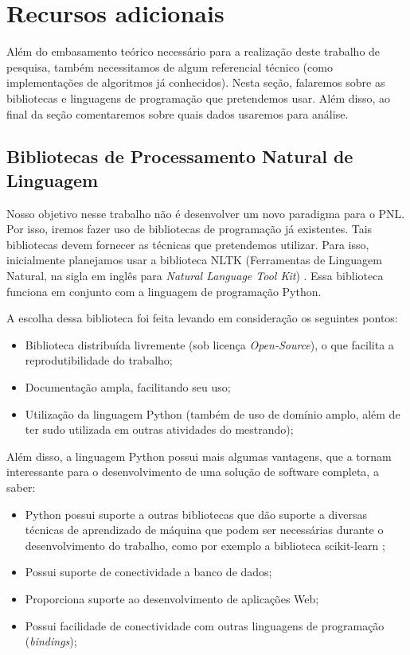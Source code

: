 \documentclass[
	12pt,				%
	openright,			%
	twoside,			%
	a4paper,			%
	english,			%
	spanish,			%
	brazil,				%
	]{abntex2}
\begin{document}
\section{Recursos adicionais}
Além do embasamento teórico necessário para a realização deste trabalho de pesquisa, também necessitamos de algum referencial técnico (como implementações de algoritmos já conhecidos). Nesta seção, falaremos sobre as bibliotecas e linguagens de programação que pretendemos usar. Além disso, ao final da seção comentaremos sobre quais dados usaremos para análise.

\subsection{Bibliotecas de Processamento Natural de Linguagem}

Nosso objetivo nesse trabalho não é desenvolver um novo paradigma para o PNL. Por isso, iremos fazer uso de bibliotecas de programação já existentes. Tais bibliotecas devem fornecer as técnicas que pretendemos utilizar. Para isso, inicialmente planejamos usar a biblioteca NLTK (Ferramentas de Linguagem Natural, na sigla em inglês para \emph{Natural Language Tool Kit}) \cite{bird2009natural}. Essa biblioteca funciona em conjunto com a linguagem de programação Python.

A escolha dessa biblioteca foi feita levando em consideração os seguintes pontos:

\begin{itemize}
	\item Biblioteca distribuída livremente (sob licença \emph{Open-Source}), o que facilita a reprodutibilidade do trabalho;
	\item Documentação ampla, facilitando seu uso;
	\item Utilização da linguagem Python (também de uso de domínio amplo, além de ter sudo utilizada em outras atividades do mestrando);
\end{itemize}

Além disso, a linguagem Python possui mais algumas vantagens, que a tornam interessante para o desenvolvimento de uma solução de software completa, a saber:

\begin{itemize}
	\item Python possui suporte a outras bibliotecas que dão suporte a diversas técnicas de aprendizado de máquina que podem ser necessárias durante o desenvolvimento do trabalho, como por exemplo a biblioteca scikit-learn \cite{pedregosa2008scikitlearn};
	\item Possui suporte de conectividade a banco de dados;
	\item Proporciona suporte ao desenvolvimento de aplicações Web;
	\item Possui facilidade de conectividade com outras linguagens de programação (\emph{bindings});
\end{itemize}
\end{document}
